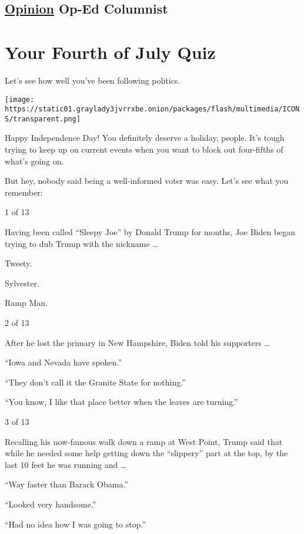 \hypertarget{-opinion--op-ed-columnist}{%
\subsection{\texorpdfstring{ \href{/section/opinion}{Opinion}
\textbar{}Op-Ed
Columnist}{ Opinion  \textbar{}Op-Ed Columnist}}\label{-opinion--op-ed-columnist}}

\hypertarget{your-fourth-of-july-quiz}{%
\section{Your Fourth of July Quiz}\label{your-fourth-of-july-quiz}}

Let's see how well you've been following politics.

\texttt{[image: https://static01.graylady3jvrrxbe.onion/packages/flash/multimedia/ICONS/transparent.png]}

Happy Independence Day! You definitely deserve a holiday, people. It's
tough trying to keep up on current events when you want to block out
four-fifths of what's going on.

But hey, nobody said being a well-informed voter was easy. Let's see
what you remember:

1 of 13

Having been called ``Sleepy Joe'' by Donald Trump for months, Joe Biden
began trying to dub Trump with the nickname \ldots{}

Tweety.

Sylvester.

Ramp Man.

2 of 13

After he lost the primary in New Hampshire, Biden told his supporters
\ldots{}

``Iowa and Nevada have spoken.''

``They don't call it the Granite State for nothing.''

``You know, I like that place better when the leaves are turning.''

3 of 13

Recalling his now-famous walk down a ramp at West Point, Trump said that
while he needed some help getting down the ``slippery'' part at the top,
by the last 10 feet he was running and \ldots{}

``Way faster than Barack Obama.''

``Looked very handsome.''

``Had no idea how I was going to stop.''

